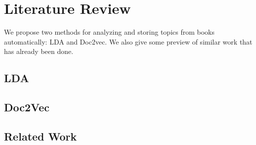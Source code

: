 
\section{Literature Review} \label{section:algorithms}
We propose two methods for analyzing and storing topics from books automatically: LDA and Doc2vec. 
We also give some preview of similar work that has already been done.

\subsection{LDA}




\subsection{Doc2Vec}





\subsection{Related Work}